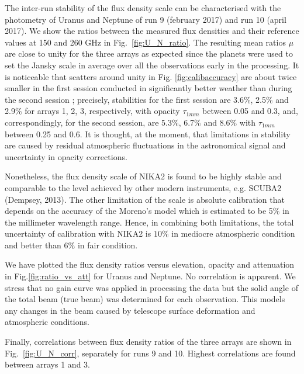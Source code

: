 The inter-run stability of the flux density scale
can be characterised with  the photometry of Uranus and Neptune of run 9 (february 2017) and run 10 (april 2017).
We show the ratios between the measured flux densities
and their reference values at 150 and 260 GHz in Fig.~\ref{fig:U_N_ratio}.  
The resulting mean ratios $\mu$
are close to unity for the three arrays as expected since
the planets were used to set the Jansky scale in average over all the observations early in the processing. It is noticeable
that scatters around unity in Fig. \ref{fig:calibaccuracy}
are about twice smaller in the first session conducted in significantly better weather than during the second session ;
precisely, stabilities for the first session
are 3.6\%, 2.5\% and 2.9\% for arrays 1, 2, 3, respectively, with opacity $\tau_{1mm}$ between 0.05 and 0.3,
and, correspondingly, for the second session, are  5.3\%, 6.7\% and 8.6\%  with  $\tau_{1mm}$ between 0.25 and 0.6.
It is thought, at the moment, that limitations in stability are caused by residual atmospheric fluctuations
in the astronomical signal and uncertainty in opacity corrections.

Nonetheless, the flux density scale of NIKA2 is found to be highly stable and comparable to the level achieved
by other modern instruments, e.g. SCUBA2 (Dempsey, 2013).
The other limitation of the scale is absolute calibration that depends on the
accuracy of the Moreno's model which is estimated to be 5\% in the millimeter wavelength range. Hence, in combining
both limitations,
the total uncertainty of calibration with NIKA2 is $10\%$ in mediocre atmospheric condition and better than $6\%$
in fair condition.

We have plotted the flux density ratios versus elevation, opacity and attenuation in  Fig.\ref{fig:ratio_vs_att} for Uranus and
Neptune. No correlation is apparent. We stress that no gain curve was applied in processing the data but
the solid angle of the total beam (true beam) was determined for each observation. This models any changes
in the beam caused by telescope surface deformation and atmospheric conditions.


Finally, correlations between flux density ratios of the three arrays are shown in Fig.~\ref{fig:U_N_corr}, separately
for runs 9 and  10. Highest correlations are found between arrays 1 and 3.


